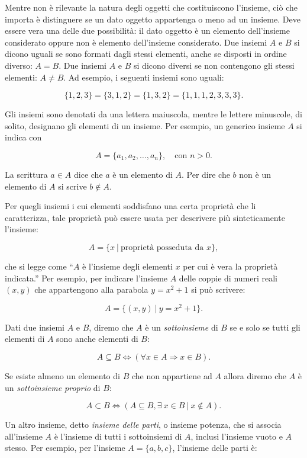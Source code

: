 \documentclass[
  italian,
  letterpaper,
  a4paper,
  11pt,
  open=any]{scrbook}
\theoremstyle{plain}
\theoremstyle{definition}
\theoremstyle{definition}
\theoremstyle{remark}
\begin{document}
Mentre non è rilevante la natura degli oggetti che costituiscono
l'insieme, ciò che importa è distinguere se un dato oggetto appartenga o
meno ad un insieme. Deve essere vera una delle due possibilità: il dato
oggetto è un elemento dell'insieme considerato oppure non è elemento
dell'insieme considerato. Due insiemi \(A\) e \(B\) si dicono uguali se
sono formati dagli stessi elementi, anche se disposti in ordine diverso:
\(A=B\). Due insiemi \(A\) e \(B\) si dicono diversi se non contengono
gli stessi elementi: \(A \neq B\). Ad esempio, i seguenti insiemi sono
uguali:

\[
\{1, 2, 3\} = \{3, 1, 2\} = \{1, 3, 2\}= \{1, 1, 1, 2, 3, 3, 3\}.
\]

Gli insiemi sono denotati da una lettera maiuscola, mentre le lettere
minuscole, di solito, designano gli elementi di un insieme. Per esempio,
un generico insieme \(A\) si indica con

\[
A = \{a_1, a_2, \dots, a_n\}, \quad \text{con } n > 0.
\]

La scrittura \(a \in A\) dice che \(a\) è un elemento di \(A\). Per dire
che \(b\) non è un elemento di \(A\) si scrive \(b \notin A.\)

Per quegli insiemi i cui elementi soddisfano una certa proprietà che li
caratterizza, tale proprietà può essere usata per descrivere più
sinteticamente l'insieme:

\[
A = \{x ~\vert~ \text{proprietà posseduta da } x\},
\]

che si legge come ``\(A\) è l'insieme degli elementi \(x\) per cui è
vera la proprietà indicata.'' Per esempio, per indicare l'insieme \(A\)
delle coppie di numeri reali \((x,y)\) che appartengono alla parabola
\(y = x^2 + 1\) si può scrivere:

\[
A = \{(x,y) ~\vert~ y = x^2 + 1\}.
\]

Dati due insiemi \(A\) e \(B\), diremo che \(A\) è un
\emph{sottoinsieme} di \(B\) se e solo se tutti gli elementi di \(A\)
sono anche elementi di \(B\):

\[
A \subseteq B \iff (\forall x \in A \Rightarrow x \in B).
\]

Se esiste almeno un elemento di \(B\) che non appartiene ad \(A\) allora
diremo che \(A\) è un \emph{sottoinsieme proprio} di \(B\):

\[
A \subset B \iff (A \subseteq B, \exists~ x \in B ~\vert~ x \notin A).
\]

Un altro insieme, detto \emph{insieme delle parti}, o insieme potenza,
che si associa all'insieme \(A\) è l'insieme di tutti i sottoinsiemi di
\(A\), inclusi l'insieme vuoto e \(A\) stesso. Per esempio, per
l'insieme \(A = \{a, b, c\}\), l'insieme delle parti è:
\end{document}
